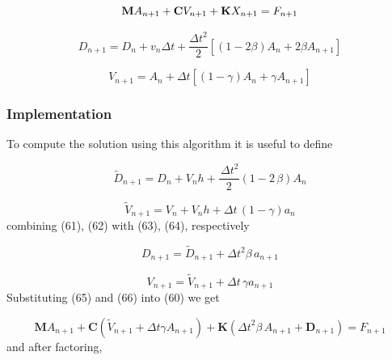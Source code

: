 \documentclass{article}
\begin{document}
				\begin{equation}
					\\
					\textbf{M}A_{n+1}+\textbf{C}V_{n+1}+\textbf{K}X_{n+1} =F_{n+1}
					\\
				\end{equation}

				\begin{equation}
					D_{n+1} = D_{n}+v_{n}\Delta t+\frac{{\Delta t}^{2}}{2}[(1-2\beta)A_n + 2\beta A_{n+1}]
				\end{equation}

				\begin{equation}
					V_{n+1} = A_{n}+\Delta t[(1-\gamma)A_n + \gamma A_{n+1}]
				\end{equation}

	
	\subsubsection{Implementation}
To compute the solution using this algorithm it is useful to define

				\begin{equation}
					\widetilde{D}_{n+1} = D_n+V_{n}h+\frac{\,{\Delta t}^{2}}{2} \left( 1-2\,\beta \right) A_{{n}}
				\end{equation}

				\begin{equation}
					\widetilde{V}_{n+1} = V_n+V_{n}h+\Delta t\, \left( 1-\gamma \right) a_{{n}}	
				\end{equation}
combining (61), (62) with (63), (64), respectively

				\begin{equation}
					D_{n+1} = \widetilde{D}_{n+1}+{\Delta t}^{2}\beta\,a_{{n+1}}
				\end{equation}

				\begin{equation}
					V_{{n+1}}=\widetilde{V}_{{n+1}} + \Delta t\,\gamma a_{{n+1}}
				\end{equation}
Substituting (65) and (66) into (60) we get
	
				\begin{equation*}
					\textbf{M}A_{{n+1}}+\textbf{C} \left(\widetilde{V}_{{n+1}}+\Delta t\gamma A_{{n+1}} \right) +\textbf{K} \left( {\Delta t}^{2}\beta\,A_{{n+1}}+\textbf{D}_{{n+1}} \right) =F_{{n+1}}
				\end{equation*}
and after factoring, 
\end{document}
